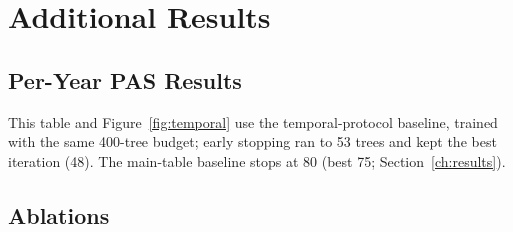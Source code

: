 \chapter{Additional Results}
\label{app:results}

\section{Per-Year PAS Results}

\begin{table}[h]
\centering
\small
\caption{PAS by survey year for the temporal-protocol model on the held-out
respondent rows. The 2022 and 2024 waves have two candidates, so chance choice
accuracy is 0.5.}
\label{tab:year_full}
\par\smallskip\footnotesize
This table and Figure~\ref{fig:temporal} use the temporal-protocol baseline,
trained with the same 400-tree budget; early stopping ran to 53 trees and kept
the best iteration (48). The main-table baseline stops at 80 (best 75;
Section~\ref{ch:results}).
\end{table}

\section{Ablations}

